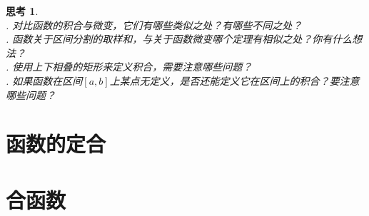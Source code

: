 \documentclass[12pt,UTF8]{ctexbook}
\newtheorem{sk}{思考}[section]
\begin{document}








\begin{sk}
    \mbox{} \\
    . 对比函数的积合与微变，它们有哪些类似之处？有哪些不同之处？\\
    . 函数关于区间分割的取样和，与关于函数微变哪个定理有相似之处？你有什么想法？\\
    . 使用上下相叠的矩形来定义积合，需要注意哪些问题？\\
    . 如果函数在区间$[a, b]$上某点无定义，是否还能定义它在区间上的积合？要注意哪些问题？
\end{sk}

\section{函数的定合}
\section{合函数}
\end{document}
